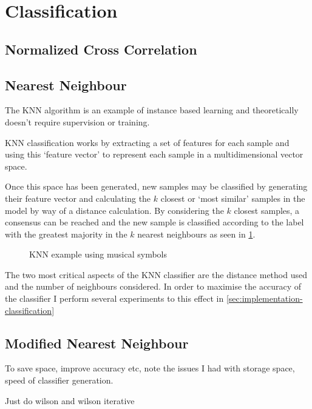 \section{Classification}

\subsection{Normalized Cross Correlation}

\subsection{Nearest Neighbour}

The \acrfull{KNN} algorithm is an example of instance based learning and theoretically doesn't require supervision or training.

KNN classification works by extracting a set of features for each sample and using this `feature vector' to represent each sample in a multidimensional vector space.

Once this space has been generated, new samples may be classified by generating their feature vector and calculating the $k$ closest or `most similar' samples in the model by way of a distance calculation. By considering the $k$ closest samples, a consensus can be reached and the new sample is classified according to the label with the greatest majority in the $k$ nearest neighbours as seen in \cref{fig:knn-example}.

 \begin{figure}[h!]
   \centering
   \caption{KNN example using musical symbols}
   \label{fig:knn-example}
 \end{figure}

The two most critical aspects of the KNN classifier are the distance method used and the number of neighbours considered. In order to maximise the accuracy of the classifier I perform several experiments to this effect in \cref{sec:implementation-classification}

\subsection{Modified Nearest Neighbour}

To save space, improve accuracy etc, note the issues I had with storage space, speed of classifier generation.

Just do wilson and wilson iterative
